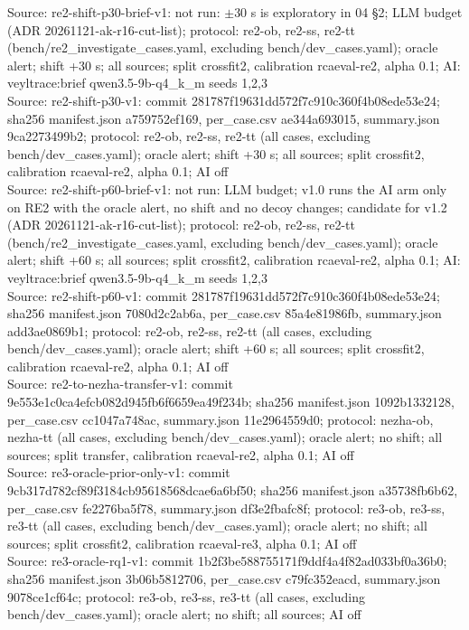 \begin{table}[t]
Source: re2-shift-p30-brief-v1: not run: $\pm$30 s is exploratory in 04 \S{}2; LLM budget (ADR 20261121-ak-r16-cut-list); protocol: re2-ob, re2-ss, re2-tt (bench/re2\_investigate\_cases.yaml, excluding bench/dev\_cases.yaml); oracle alert; shift +30 s; all sources; split crossfit2, calibration rcaeval-re2, alpha 0.1; AI: veyltrace:brief qwen3.5-9b-q4\_k\_m seeds 1,2,3\\
Source: re2-shift-p30-v1: commit 281787f19631dd572f7c910c360f4b08ede53e24; sha256 manifest.json a759752ef169, per\_case.csv ae344a693015, summary.json 9ca2273499b2; protocol: re2-ob, re2-ss, re2-tt (all cases, excluding bench/dev\_cases.yaml); oracle alert; shift +30 s; all sources; split crossfit2, calibration rcaeval-re2, alpha 0.1; AI off\\
Source: re2-shift-p60-brief-v1: not run: LLM budget; v1.0 runs the AI arm only on RE2 with the oracle alert, no shift and no decoy changes; candidate for v1.2 (ADR 20261121-ak-r16-cut-list); protocol: re2-ob, re2-ss, re2-tt (bench/re2\_investigate\_cases.yaml, excluding bench/dev\_cases.yaml); oracle alert; shift +60 s; all sources; split crossfit2, calibration rcaeval-re2, alpha 0.1; AI: veyltrace:brief qwen3.5-9b-q4\_k\_m seeds 1,2,3\\
Source: re2-shift-p60-v1: commit 281787f19631dd572f7c910c360f4b08ede53e24; sha256 manifest.json 7080d2c2ab6a, per\_case.csv 85a4e81986fb, summary.json add3ae0869b1; protocol: re2-ob, re2-ss, re2-tt (all cases, excluding bench/dev\_cases.yaml); oracle alert; shift +60 s; all sources; split crossfit2, calibration rcaeval-re2, alpha 0.1; AI off\\
Source: re2-to-nezha-transfer-v1: commit 9e553e1c0ca4efcb082d945fb6f6659ea49f234b; sha256 manifest.json 1092b1332128, per\_case.csv cc1047a748ac, summary.json 11e2964559d0; protocol: nezha-ob, nezha-tt (all cases, excluding bench/dev\_cases.yaml); oracle alert; no shift; all sources; split transfer, calibration rcaeval-re2, alpha 0.1; AI off\\
Source: re3-oracle-prior-only-v1: commit 9cb317d782cf89f3184cb95618568dcae6a6bf50; sha256 manifest.json a35738fb6b62, per\_case.csv fe2276ba5f78, summary.json df3e2fbafc8f; protocol: re3-ob, re3-ss, re3-tt (all cases, excluding bench/dev\_cases.yaml); oracle alert; no shift; all sources; split crossfit2, calibration rcaeval-re3, alpha 0.1; AI off\\
Source: re3-oracle-rq1-v1: commit 1b2f3be588755171f9ddf4a4f82ad033bf0a36b0; sha256 manifest.json 3b06b5812706, per\_case.csv c79fc352eacd, summary.json 9078ce1cf64c; protocol: re3-ob, re3-ss, re3-tt (all cases, excluding bench/dev\_cases.yaml); oracle alert; no shift; all sources; AI off\\

\end{table}
